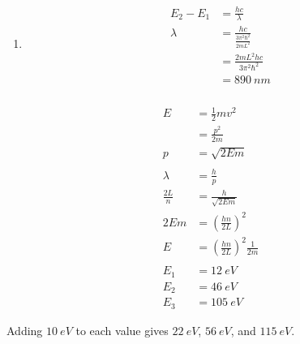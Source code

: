\documentclass{article}
\begin{document}
\begin{enumerate}
  \item

        \begin{align*}
          E_2 - E_1 & = \frac{h c}{\lambda}                         \\
          \lambda   & = \frac{h c}{\frac{3 \pi^2 \hbar^2}{2 m L^2}} \\
                    & = \frac{2 m L^2 h c}{3 \pi^2 \hbar^2}         \\
                    & = \qty{890}{nm}
        \end{align*}
\end{enumerate}

\setcounter{subsubsection}{62}
\subsubsection{}

\begin{align*}
  E             & = \frac{1}{2} m v^2                              \\
                & = \frac{p^2}{2 m}                                \\
  p             & = \sqrt{2 E m}                                   \\ \\
  \lambda       & = \frac{h}{p}                                    \\
  \frac{2 L}{n} & = \frac{h}{\sqrt{2 E m}}                         \\
  2 E m         & = \left( \frac{h n}{2 L} \right)^2               \\
  E             & = \left( \frac{h n}{2 L} \right)^2 \frac{1}{2 m} \\ \\
  E_1           & = \qty{12}{eV}                                   \\
  E_2           & = \qty{46}{eV}                                   \\
  E_3           & = \qty{105}{eV}
\end{align*}

Adding $\qty{10}{eV}$ to each value gives $\qty{22}{eV}$, $\qty{56}{eV}$, and $\qty{115}{eV}$.

\setcounter{subsubsection}{64}
\subsubsection{}
\end{document}
